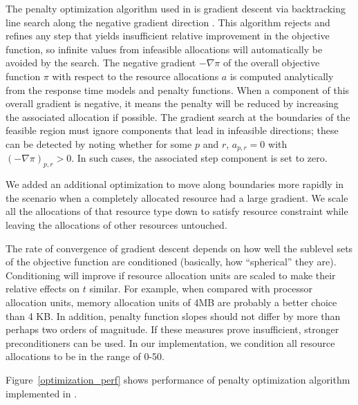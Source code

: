The penalty optimization algorithm used in \pacora is gradient descent via backtracking line search along the negative gradient direction \cite{BoVa}.
This algorithm rejects and refines any step that yields insufficient relative improvement in the objective function,
so infinite values from infeasible allocations will automatically be avoided by the search.
The negative gradient $-\nabla\pi$ of the overall objective function $\pi$
with respect to the resource allocations $a$
is computed analytically from the response time models and penalty functions.
When a component of this overall gradient is negative,
it means the penalty will be reduced by increasing the associated allocation if possible.
The gradient search at the boundaries of the feasible region
must ignore components that lead in infeasible directions;
these can be detected by noting whether for some $p$ and $r$, $a_{p,r} = 0$ with $(-\nabla\pi)_{p,r} > 0$.
In such cases, the associated step component is set to zero.

We added an additional optimization to move along boundaries more rapidly in the scenario when a completely allocated resource had a large gradient.  We scale all the allocations of that resource type down to satisfy resource constraint while leaving the allocations of other resources untouched.

The rate of convergence of gradient descent depends on how well the sublevel sets of the objective function
are conditioned (basically, how ``spherical'' they are).
Conditioning will improve if resource allocation units are scaled to make their relative effects on $t$ similar.
For example, when compared with processor allocation units,
memory allocation units of 4MB are probably a better choice than 4 KB.
In addition, penalty function slopes should not differ by more than perhaps two orders of magnitude. If these measures prove insufficient, stronger preconditioners can be used. In our implementation, we condition all resource allocations to be in the range of 0-50.


\begin{figure*}[!t]
	\begin{center}	
		\caption{Performance of our penalty optimization algorithm}
		\label{optimization_perf}
	\end{center}
\end{figure*}

Figure~\ref{optimization_perf} shows performance of penalty optimization algorithm implemented in \tess.  

